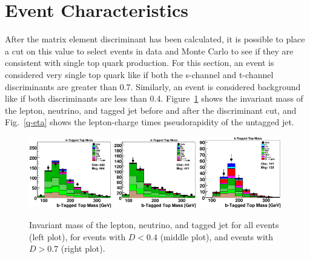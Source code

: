 \clearpage

\section{Event Characteristics}
\label{sec:eventcharacteristics}

After the matrix element discriminant has been calculated, it is
possible to place a cut on this value to select events in data and
Monte Carlo to see if they are consistent with single top quark
production. For this section, an event is considered very single top
quark like if both the s-channel and t-channel discriminants are
greater than 0.7. Similarly, an event is considered background like if
both discriminants are less than 0.4. Figure~\ref{top-mass} shows the
invariant mass of the lepton, neutrino, and tagged jet before and
after the discriminant cut, and Fig.~\ref{q-eta} shows the
lepton-charge times pseudorapidity of the untagged jet.

\begin{figure}[!h!tbp]
\includegraphics[width=0.32\textwidth]
{figures/topovars/BTaggedTopMass_0.eps}
\includegraphics[width=0.32\textwidth]
{figures/topovars/BTaggedTopMass_-0.4.eps}
\includegraphics[width=0.32\textwidth]
{figures/topovars/BTaggedTopMass_0.7.eps}
\vspace{-0.1in}
\caption[topmass]{Invariant mass of the lepton, neutrino, and tagged
jet for all events (left plot), for events with $D < 0.4$ (middle
plot), and events with $D > 0.7$ (right plot).}
\label{top-mass}
\end{figure}

